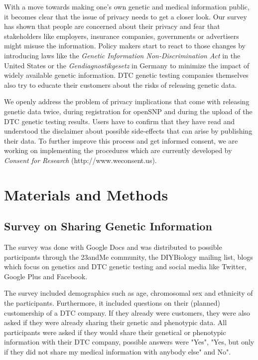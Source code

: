 \documentclass[10pt]{article}
\begin{document}
With a move towards making one's own genetic and medical information public, it becomes clear that the issue of privacy needs to get a closer look. Our survey has shown that people are concerned about their privacy and fear that stakeholders like employers, insurance companies, governments or advertisers might misuse the information. Policy makers start to react to those changes by introducing laws like the \textit{Genetic Information Non-Discrimination Act} in the United States or the \emph{Gendiagnostikgesetz} in Germany to minimize the impact of widely available genetic information. DTC genetic testing companies themselves also try to educate their customers about the risks of releasing genetic data.  

We openly address the problem of privacy implications that come with releasing genetic data twice, during registration for openSNP and during the upload of the DTC genetic testing results. Users have to confirm that they have read and understood the disclaimer about possible side-effects that can arise by publishing their data. To further improve this process and get informed consent, we are working on implementing the procedures which are currently developed by \textit{Consent for Research} (http://www.weconsent.us).
 
\section*{Materials and Methods}
\subsection*{Survey on Sharing Genetic Information}
The survey was done with Google Docs and was distributed to possible participants through the 23andMe community, the DIYBiology mailing list, blogs which focus on genetics and DTC genetic testing and social media like Twitter, Google Plus and Facebook.  

The survey included demographics such as age, chromosomal sex and ethnicity of the participants. Furthermore, it included questions on their (planned) customership of a DTC company. If they already were customers, they were also asked if they were already sharing their genetic and phenotypic data. All participants were asked if they would share their genetical or phenotypic information with their DTC company, possible answers were "Yes", "Yes, but only if they did not share my medical information with anybody else" and No".
\end{document}
